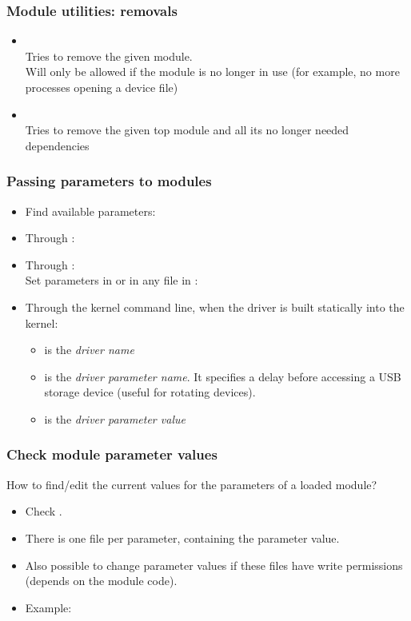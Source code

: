 \begin{frame}
  \frametitle{Module utilities: removals}
  \begin{itemize}
  \item {}\\
    Tries to remove the given module.\\
    Will only be allowed if the module is no longer in use (for
    example, no more processes opening a device file)
  \item {}\\
    Tries to remove the given top module and all its no longer needed dependencies
  \end{itemize}
\end{frame}

\begin{frame}
  \frametitle{Passing parameters to modules}
  \begin{itemize}
  \item Find available parameters:\\
  \item Through :\\
  \item Through :\\
    Set parameters in  or in any file in :\\
  \item Through the kernel command line, when the driver is built statically into the kernel:\\
    \begin{itemize}
    \item {} is the {\em driver name}
    \item {} is the {\em driver parameter name}. It
      specifies a delay before accessing a USB storage device (useful for
      rotating devices).
    \item {} is the {\em driver parameter value}
    \end{itemize}
  \end{itemize}
\end{frame}

\begin{frame}
  \frametitle{Check module parameter values}
  How to find/edit the current values for the parameters of a loaded module?
  \begin{itemize}
  \item Check .
  \item There is one file per parameter, containing the parameter value.
  \item Also possible to change parameter values if these files have
        write permissions (depends on the module code).
  \item Example:\\
  \end{itemize}
\end{frame}
